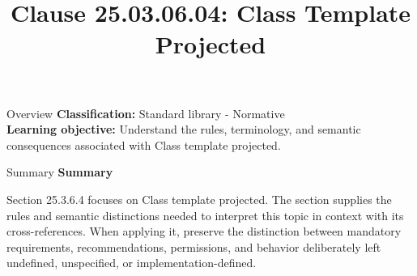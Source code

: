 \documentclass[10pt,letterpaper]{article}
\title{Clause 25.03.06.04: Class Template Projected}
\author{}
\date{}
\begin{document}
\maketitle
\begin{CornellOverviewBox}{Overview}
\textbf{Classification:} Standard library - Normative\\[2pt]
\textbf{Learning objective:} Understand the rules, terminology, and semantic consequences associated with Class template projected.
\end{CornellOverviewBox}\begin{CornellSummaryBox}{Summary}
{\sffamily\bfseries\color{Accent} Summary}\par\vspace{3pt}Section 25.3.6.4 focuses on Class template projected. The section supplies the rules and semantic distinctions needed to interpret this topic in context with its cross-references. When applying it, preserve the distinction between mandatory requirements, recommendations, permissions, and behavior deliberately left undefined, unspecified, or implementation-defined.
\end{CornellSummaryBox}
\end{document}

